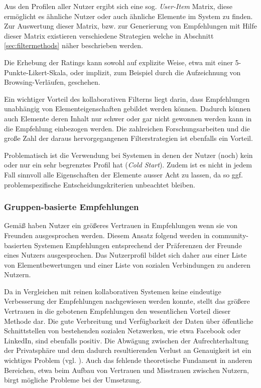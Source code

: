 Aus den Profilen aller Nutzer ergibt sich eine sog. \textit{User-Item} Matrix, diese ermöglicht es ähnliche Nutzer oder auch ähnliche Elemente im System zu finden. Zur Auswertung dieser Matrix, bzw. zur Generierung von Empfehlungen mit Hilfe dieser Matrix existieren verschiedene Strategien welche in Abschnitt \ref{sec:filtermethods} näher beschrieben werden.

Die Erhebung der Ratings kann sowohl auf explizite Weise, etwa mit einer 5-Punkte-Likert-Skala, oder implizit, zum Beispiel durch die Aufzeichnung von Browsing-Verläufen, geschehen.

Ein wichtiger Vorteil des kollaborativen Filterns liegt darin, dass Empfehlungen unabhängig von Elementeigenschaften gebildet werden können. Dadurch können auch Elemente deren Inhalt nur schwer oder gar nicht gewonnen werden kann in die Empfehlung einbezogen werden. Die zahlreichen Forschungsarbeiten und die große Zahl der daraus hervorgegangenen Filterstrategien ist ebenfalls ein Vorteil.

Problematisch ist die Verwendung bei Systemen in denen der Nutzer (noch) kein oder nur ein sehr begrenztes Profil hat (\textit{Cold Start}). Zudem ist es nicht in jedem Fall sinnvoll alle Eigenschaften der Elemente ausser Acht zu lassen, da so ggf. problemspezifische Entscheidungskriterien unbeachtet bleiben.  \citep{hb,Burke:2002:HRS:586321.586352} %

\subsubsection{Gruppen-basierte Empfehlungen}\label{sec:cbf_overview}
Gemäß \citep{SinhaS01} haben Nutzer ein größeres Vertrauen in Empfehlungen wenn sie von Freunden ausgesprochen werden. Diesem Ansatz folgend werden in community-basierten Systemen Empfehlungen entsprechend der Präferenzen der Freunde eines Nutzers ausgesprochen. Das Nutzerprofil bildet sich daher aus einer Liste von Elementbewertungen und einer Liste von sozialen Verbindungen zu anderen Nutzern.

Da in Vergleichen mit reinen kollaborativen Systemen keine eindeutige Verbesserung der Empfehlungen nachgewiesen werden konnte, stellt das größere Vertrauen in die gebotenen Empfehlungen den wesentlichen Vorteil dieser Methode dar. Die gute Verbreitung und Verfügbarkeit der Daten über öffentliche Schnittstellen von  bestehenden sozialen Netzwerken, wie etwa Facebook oder LinkedIn, sind ebenfalls positiv. Die Abwägung zwischen der Aufrechterhaltung der Privatsphäre und dem dadurch resultierenden Verlust an Genauigkeit ist ein wichtiges Problem (vgl. \citep{machanavajjhala:accurate}). Auch das fehlende theoretische Fundament in anderen Bereichen, etwa beim Aufbau von Vertrauen und Misstrauen zwischen Nutzern, birgt mögliche Probleme bei der Umsetzung. \citep{hb_20}

